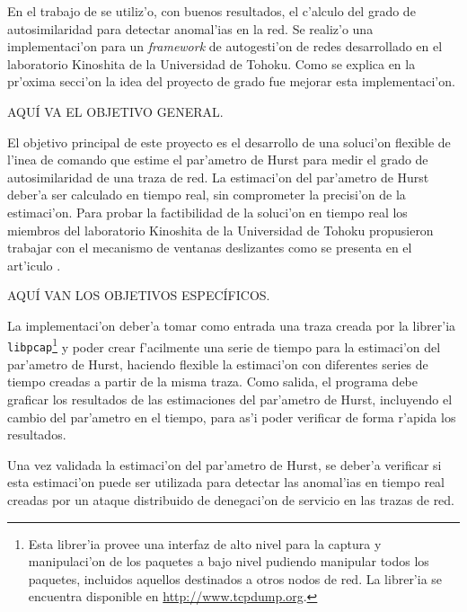 En el trabajo de \cite{mingliddos} se utiliz'o, con buenos resultados, el
c'alculo del grado de autosimilaridad para detectar anomal'ias en la red. Se
realiz'o una implementaci'on para un {\it framework} de autogesti'on de redes
desarrollado en el laboratorio Kinoshita de la Universidad de Tohoku. Como se
explica en la pr'oxima secci'on la idea del proyecto de grado fue mejorar esta
implementaci'on.

\vspace{5 mm}

\label{sect:objetivo_general}
\vspace{5 mm}

AQU\'I VA EL OBJETIVO GENERAL.

El objetivo principal de este proyecto es el desarrollo de una soluci'on
flexible de l'inea de comando que estime el par'ametro de Hurst para medir el
grado de autosimilaridad de una traza de red. La estimaci'on del par'ametro de
Hurst deber'a ser calculado en tiempo real, sin comprometer la precisi'on de la
estimaci'on. Para probar la factibilidad de la soluci'on en tiempo real los
miembros del laboratorio Kinoshita de la Universidad de Tohoku propusieron
trabajar con el mecanismo de ventanas deslizantes como se presenta en el
art'iculo \cite{TakahashiAkinori:20070913}.


\vspace{5 mm}

\label{sect:objetivos_especificos}
\vspace{5 mm}

AQU\'I VAN LOS OBJETIVOS ESPEC\'IFICOS.

La implementaci'on deber'a tomar como entrada una traza creada por la librer'ia
{\tt libpcap}\footnote{Esta librer'ia provee una interfaz de alto nivel para la
captura y manipulaci'on de los paquetes a bajo nivel pudiendo manipular todos 
los paquetes, incluidos aquellos destinados a otros nodos de red. La librer'ia
se encuentra disponible en \url{http://www.tcpdump.org}.} y poder
crear f'acilmente una serie de tiempo para la estimaci'on del par'ametro de
Hurst, haciendo flexible la estimaci'on con diferentes series de tiempo creadas
a partir de la misma traza. Como salida, el programa debe graficar los
resultados de las estimaciones del par'ametro de Hurst, incluyendo el cambio del
par'ametro en el tiempo, para as'i poder verificar de forma r'apida los
resultados. 

Una vez validada la estimaci'on del par'ametro de Hurst, se deber'a verificar si
esta estimaci'on puede ser utilizada para detectar las anomal'ias en tiempo
real creadas por un ataque distribuido de denegaci'on de servicio en las trazas
de red.


